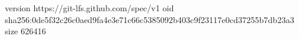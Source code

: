 version https://git-lfs.github.com/spec/v1
oid sha256:0de5f32c26c0aed9fa4e3e71c66c5385092b403c9f23117e0cd37255b7db23a3
size 626416
